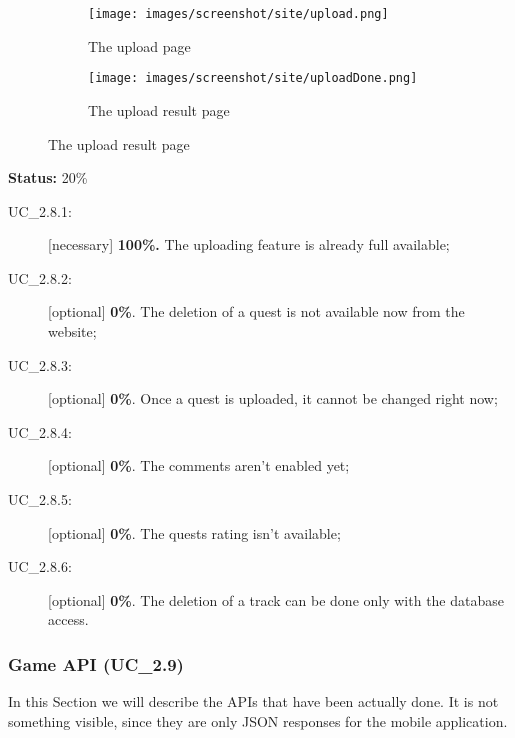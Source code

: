 \begin{figure}[H]    
        \begin{subfigure}[b]{\textwidth}
                \centering
\texttt{[image: images/screenshot/site/upload.png]}
\caption{The upload page}
\label{fig:siteUpload}
        \end{subfigure}
        
        \begin{subfigure}[b]{\textwidth}
                \centering
\texttt{[image: images/screenshot/site/uploadDone.png]}
\caption{The upload result page}
\label{fig:siteUploadDonePage}
        \end{subfigure}
\end{figure}

\textbf{Status:} 20\%
		\begin{description}
			\item[UC\_2.8.1:] [necessary] \textbf{100\%.} The uploading feature is already full available;
			\item[UC\_2.8.2:] [optional] \textbf{0\%}. The deletion of a quest is not available now from the website;
			\item[UC\_2.8.3:] [optional] \textbf{0\%}. Once a quest is uploaded, it cannot be changed right now;
			\item[UC\_2.8.4:] [optional] \textbf{0\%}. The comments aren't enabled yet;
			\item[UC\_2.8.5:] [optional] \textbf{0\%}. The quests rating isn't available;
			\item[UC\_2.8.6:] [optional] \textbf{0\%}. The deletion of a track can be done only with the database access.
		\end{description}

\subsubsection{Game API (UC\_2.9)}
\label{sec:GameApiFinal}

In this Section we will describe the APIs that have been actually done. It is not something visible, since they are only JSON responses for the mobile application.

